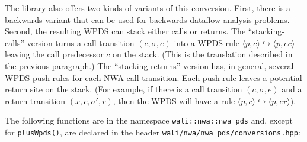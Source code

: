 The library also offers two kinds of variants of this conversion. First, there
is a backwards variant that can be used for backwards dataflow-analysis
problems. Second, the resulting WPDS can stack either calls or returns. The
``stacking-calls'' version turns a call transition $(c, \sigma, e)$ into a
WPDS rule $\langle p, c\rangle \hookrightarrow \langle p, e c\rangle$ --
leaving the call predecessor $c$ on the stack. (This is the translation
described in the previous paragraph.) The ``stacking-returns'' version
has, in general, several WPDS push rules for each NWA call transition. Each
push rule leaves a potential return site on the stack. (For example, if there
is a call transition $(c,\sigma,e)$ and a return transition $(x, c, \sigma',
r)$, then the WPDS will have a rule $\langle p,
c\rangle\hookrightarrow\langle p, e r\rangle$).


The following functions are in the namespace \texttt{wali::nwa::nwa\_pds}
and, except for \texttt{plusWpds()}, are declared in the header
\texttt{wali/nwa/nwa\_pds/conversions.hpp}:


